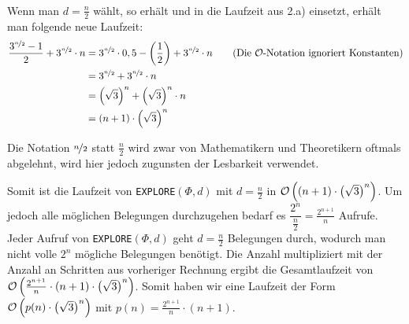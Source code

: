 \documentclass[a4paper]{article}
\newcommand{\explore}{\texttt{EXPLORE$(\Phi, d)$}\xspace}
\begin{document}
	\subsubsection{}
	Wenn man $d=\frac{n}{2}$ wählt, so erhält und in die Laufzeit aus 2.a) einsetzt, erhält man folgende neue Laufzeit:
	\begin{align*}
			\frac{3^{\nicefrac{n}{2}}-1}{2}+3^{\nicefrac{n}{2}}\cdot n
		&=	3^{\nicefrac{n}{2}}\cdot 0,5- \left(\frac{1}{2}\right)+3^{\nicefrac{n}{2}}\cdot n
			\tag{Die $\mathcal{O}$-Notation ignoriert Konstanten}\\
		&=	3^{\nicefrac{n}{2}}+3^{\nicefrac{n}{2}}\cdot n\\
		&=	\left(\sqrt{3}\right)^n+\left(\sqrt{3}\right)^n\cdot n\\
		&=	(n+1)\cdot \left(\sqrt{3}\right)^n
	\end{align*}
	\vspace{-2ex}
	\begin{note}
	Die Notation $\nicefrac{n}{2}$ statt $\frac{n}{2}$ wird zwar von Mathematikern und Theoretikern oftmals abgelehnt, wird hier jedoch zugunsten der Lesbarkeit verwendet.
	\end{note}
	Somit ist die Laufzeit von \explore mit $d=\frac{n}{2}$ in $\mathcal{O}\left((n+1)\cdot \left(\sqrt{3}\right)^n\right)$.\n
	Um jedoch alle möglichen Belegungen durchzugehen bedarf es $\dfrac{2^n}{\frac{n}{2}}=\frac{2^{n+1}}{n}$ Aufrufe. Jeder Aufruf von \explore geht $d=\frac{n}{2}$ Belegungen durch, wodurch man nicht volle $2^n$ mögliche Belegungen benötigt.\n
	Die Anzahl multipliziert mit der Anzahl an Schritten aus vorheriger Rechnung ergibt die Gesamtlaufzeit von $\mathcal{O}\left(\frac{2^{n+1}}{n}\cdot (n+1)\cdot \left(\sqrt{3}\right)^n\right)$.\n
	Somit haben wir eine Laufzeit der Form $\mathcal{O}\left(p(n)\cdot \left(\sqrt{3}\right)^n\right)$ mit $p(n)=\frac{2^{n+1}}{n}\cdot (n+1)$.
\end{document}
